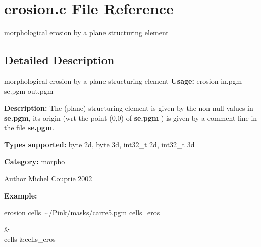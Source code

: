 \section{erosion.c File Reference}
\label{erosion_8c}


morphological erosion by a plane structuring element  




\subsection{Detailed Description}
morphological erosion by a plane structuring element {\bfseries Usage:} erosion in.pgm se.pgm out.pgm

{\bfseries Description:} The (plane) structuring element is given by the non-\/null values in {\bfseries se.pgm}, its origin (wrt the point (0,0) of {\bfseries se.pgm} ) is given by a comment line in the file {\bfseries se.pgm}.

{\bfseries Types supported:} byte 2d, byte 3d, int32\_\-t 2d, int32\_\-t 3d

{\bfseries Category:} morpho

\begin{DoxyAuthor}{Author}
Michel Couprie 2002
\end{DoxyAuthor}
{\bfseries Example:}

erosion cells $\sim$/Pink/masks/carre5.pgm cells\_\-eros

\begin{TabularC}{2}
\hline
 &  \\
cells &cells\_\-eros  \\
\end{TabularC}
